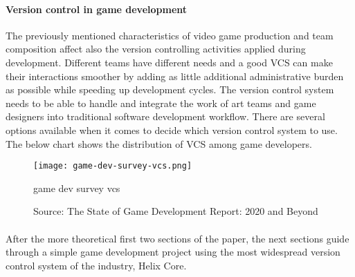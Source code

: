\paragraph{Version control in game development}
The previously mentioned characteristics of video game production and team composition affect also the version controlling 
activities applied during development. Different teams have different needs and a good VCS can make their interactions smoother 
by adding as little additional administrative burden as possible while speeding up development cycles. The version control
system needs to be able to handle and integrate the work of art teams and game designers into traditional software development
workflow.
There are several options available when it comes to decide which version control system to use. The below chart shows 
the distribution of VCS among game developers.
\begin{figure}[H]
    \centering
    \texttt{[image: game-dev-survey-vcs.png]}
    \caption{game dev survey vcs}
    \caption*{Source: The State of Game Development Report: 2020 and Beyond \protect\cite{game-dev-report-2020}}
    \label{fig:game-dev-survey-vcs}
\end{figure}

\paragraph{}
After the more theoretical first two sections of the paper, the next sections guide through a simple game development
project using the most widespread version control system of the industry, 
Helix Core\textsuperscript{\texttrademark}.